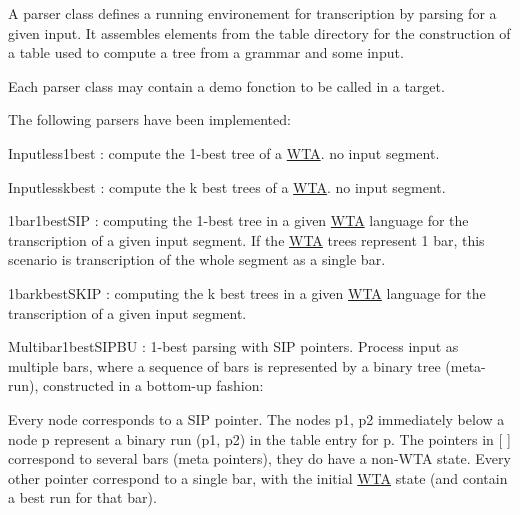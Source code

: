 A {\ttfamily parser} class defines a running environement for transcription by parsing for a given {\ttfamily input}. It assembles elements from the {\ttfamily table} directory for the construction of a table used to compute a tree from a {\ttfamily grammar} and some {\ttfamily input}.

Each {\ttfamily parser} class may contain a {\ttfamily demo} fonction to be called in a target.

The following {\ttfamily parsers} have been implemented\+:


\begin{DoxyItemize}
\item {\ttfamily Inputless1best} \+: compute the 1-\/best tree of a {\ttfamily \mbox{\hyperlink{classWTA}{W\+TA}}}. no input segment.
\item {\ttfamily Inputlesskbest} \+: compute the k best trees of a {\ttfamily \mbox{\hyperlink{classWTA}{W\+TA}}}. no input segment.
\item {\ttfamily 1bar1best\+S\+IP} \+: computing the 1-\/best tree in a given {\ttfamily \mbox{\hyperlink{classWTA}{W\+TA}}} language for the transcription of a given input segment. If the \mbox{\hyperlink{classWTA}{W\+TA}} trees represent 1 bar, this scenario is transcription of the whole segment as a single bar.
\item {\ttfamily 1barkbest\+S\+K\+IP} \+: computing the k best trees in a given {\ttfamily \mbox{\hyperlink{classWTA}{W\+TA}}} language for the transcription of a given input segment.
\item {\ttfamily Multibar1best\+S\+I\+P\+BU} \+: 1-\/best parsing with {\ttfamily S\+IP} pointers. Process input as multiple bars, where a sequence of bars is represented by a binary tree (meta-\/run), constructed in a bottom-\/up fashion\+:
\end{DoxyItemize}


\begin{DoxyCode}{0}
\DoxyCodeLine{                            [bars 1-n]}
\DoxyCodeLine{                             /     \(\backslash\)}
\DoxyCodeLine{       /      \(\backslash\)}
\DoxyCodeLine{  /    \(\backslash\)}
\end{DoxyCode}


Every node corresponds to a S\+IP pointer. The nodes {\ttfamily p1}, {\ttfamily p2} immediately below a node {\ttfamily p} represent a binary run {\ttfamily (p1, p2)} in the table entry for {\ttfamily p}. The pointers in {\ttfamily \mbox{[} \mbox{]}} correspond to several bars (meta pointers), they do have a non-\/\+W\+TA state. Every other pointer correspond to a single bar, with the initial \mbox{\hyperlink{classWTA}{W\+TA}} state (and contain a best run for that bar).

